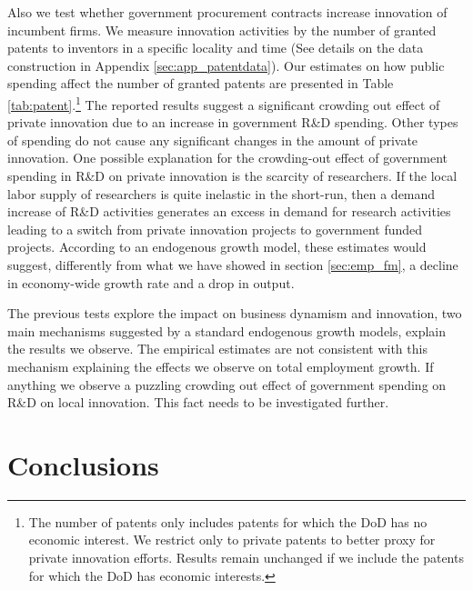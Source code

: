 \documentclass[dv_diss_main.tex]{subfiles}
\begin{document}
Also we test whether government procurement contracts increase innovation of incumbent  firms. We measure innovation activities by the number of granted patents to inventors in a specific locality and time (See details on the data construction in Appendix \ref{sec:app_patentdata}). Our estimates on how public spending affect the number of granted patents are presented in Table \ref{tab:patent}.\footnote{The number of patents only includes patents for which the DoD has no economic interest. We restrict only to private patents to better proxy for private innovation efforts. Results remain unchanged if we include the patents for which the DoD has economic interests.} The reported results suggest a significant crowding out effect of private innovation due to an increase in government R\&D spending. Other types of spending do not cause any significant changes in the amount of private innovation. One possible explanation for the crowding-out effect of government spending in R\&D on private innovation is the scarcity of researchers. If the local labor supply of researchers is quite inelastic in the short-run, then a demand increase of R\&D activities generates an excess in demand for research activities leading to a switch from private innovation projects to government funded projects. According to an endogenous growth model, these estimates would suggest, differently from what we have showed in section \ref{sec:emp_fm}, a decline in economy-wide growth rate and a drop in output.

The previous tests explore the impact on business dynamism and innovation, two main mechanisms suggested by a standard endogenous growth models, explain the results we observe. The empirical estimates are not consistent with this mechanism explaining the effects we observe on total employment growth. If anything we observe a puzzling crowding out effect of government spending on R\&D on local innovation. This fact needs to be investigated further. 



\section{Conclusions}
\label{sec:conclusion}
\end{document}
